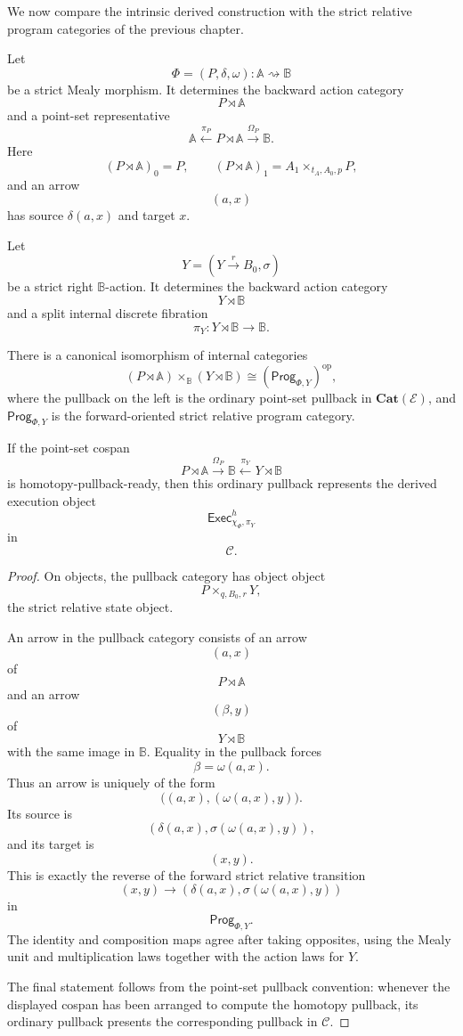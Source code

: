 We now compare the intrinsic derived construction with the strict relative
program categories of the previous chapter.

Let
\[
\Phi=(P,\delta,\omega):\mathbb A\rightsquigarrow\mathbb B
\]
be a strict Mealy morphism. It determines the backward action category
\[
P\rtimes\mathbb A
\]
and a point-set representative
\[
\mathbb A
\xleftarrow{\pi_P}
P\rtimes\mathbb A
\xrightarrow{\Omega_P}
\mathbb B.
\]
Here
\[
(P\rtimes\mathbb A)_0=P,
\qquad
(P\rtimes\mathbb A)_1=A_1\times_{t_A,A_0,p}P,
\]
and an arrow
\[
(a,x)
\]
has source \(\delta(a,x)\) and target \(x\).

Let
\[
Y=(Y\xrightarrow{r}B_0,\sigma)
\]
be a strict right \(\mathbb B\)-action. It determines the backward action
category
\[
Y\rtimes\mathbb B
\]
and a split internal discrete fibration
\[
\pi_Y:Y\rtimes\mathbb B\to\mathbb B.
\]

\begin{theorem}
\label{thm:strict-relative-programs-as-derived-representatives}
There is a canonical isomorphism of internal categories
\[
(P\rtimes\mathbb A)
\times_{\mathbb B}
(Y\rtimes\mathbb B)
\cong
\left(\mathsf{Prog}_{\Phi,Y}\right)^{\mathrm{op}},
\]
where the pullback on the left is the ordinary point-set pullback in
\(\mathbf{Cat}(\mathcal E)\), and \(\mathsf{Prog}_{\Phi,Y}\) is the
forward-oriented strict relative program category.

If the point-set cospan
\[
P\rtimes\mathbb A
\xrightarrow{\Omega_P}
\mathbb B
\xleftarrow{\pi_Y}
Y\rtimes\mathbb B
\]
is homotopy-pullback-ready, then this ordinary pullback represents the derived
execution object
\[
\mathsf{Exec}^h_{\chi_\Phi,\pi_Y}
\]
in
\[
\mathcal C.
\]
\end{theorem}

\begin{proof}
On objects, the pullback category has object object
\[
P\times_{q,B_0,r}Y,
\]
the strict relative state object.

An arrow in the pullback category consists of an arrow
\[
(a,x)
\]
of
\[
P\rtimes\mathbb A
\]
and an arrow
\[
(\beta,y)
\]
of
\[
Y\rtimes\mathbb B
\]
with the same image in \(\mathbb B\). Equality in the pullback forces
\[
\beta=\omega(a,x).
\]
Thus an arrow is uniquely of the form
\[
\bigl((a,x),(\omega(a,x),y)\bigr).
\]
Its source is
\[
\left(
\delta(a,x),
\sigma(\omega(a,x),y)
\right),
\]
and its target is
\[
(x,y).
\]
This is exactly the reverse of the forward strict relative transition
\[
(x,y)
\longrightarrow
\left(
\delta(a,x),
\sigma(\omega(a,x),y)
\right)
\]
in
\[
\mathsf{Prog}_{\Phi,Y}.
\]
The identity and composition maps agree after taking opposites, using the
Mealy unit and multiplication laws together with the action laws for \(Y\).

The final statement follows from the point-set pullback convention: whenever
the displayed cospan has been arranged to compute the homotopy pullback, its
ordinary pullback presents the corresponding pullback in \(\mathcal C\).
\end{proof}

